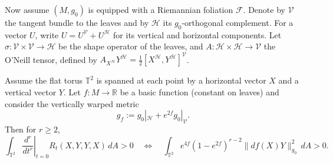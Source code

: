 \documentclass[graybox]{svmult}
\begin{document}
Now assume $(M,g_0)$ is equipped with a Riemannian foliation $\mathcal{F}$. Denote by $\mathcal{V}$ the tangent bundle to the leaves and by $\mathcal{H}$ its $g_0$-orthogonal complement. For a vector $U$, write $U = U^{\mathcal{V}} + U^{\mathcal{H}}$ for its vertical and horizontal components. Let $\sigma : \mathcal{V} \times \mathcal{V} \to \mathcal{H}$ be the shape operator of the leaves, and $A : \mathcal{H} \times \mathcal{H} \to \mathcal{V}$ the O'Neill tensor, defined by $A_{X^{\mathcal{H}}} Y^{\mathcal{H}} = \frac{1}{2}[X^{\mathcal{H}}, Y^{\mathcal{H}}]^{\mathcal{V}}$.

\begin{proposition}\label{prop:gvw}
Assume the flat torus $\mathbb{T}^2$ is spanned at each point by a horizontal vector $X$ and a vertical vector $Y$. Let $f : M \to \mathbb{R}$ be a basic function (constant on leaves) and consider the vertically warped metric
\[
g_f := g_0|_{\mathcal{H}} + e^{2f} g_0|_{\mathcal{V}}.
\]
Then for $r \geq 2$,
\[
\int_{\mathbb{T}^2} \left.\frac{d^r}{dt^r}\right|_{t=0} R_t(X,Y,Y,X) \, dA > 0
\quad\Longleftrightarrow\quad
\int_{\mathbb{T}^2} e^{4f}(1 - e^{2f})^{r-2} \|df(X) Y\|_{g_0}^2 \, dA > 0.
\]
\end{proposition}
\end{document}
